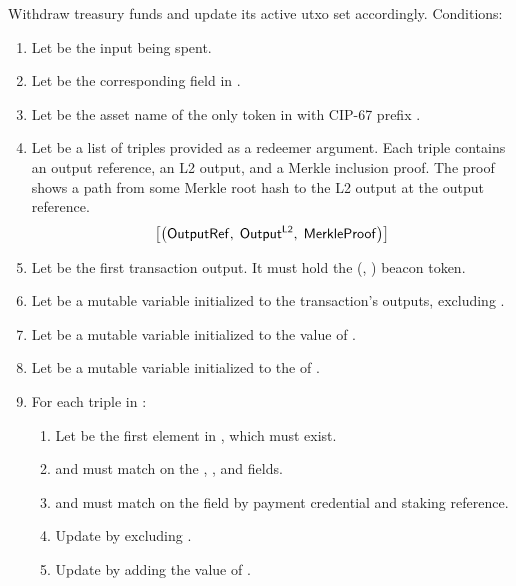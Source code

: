 \documentclass[../hydrozoa.tex]{subfiles}
\begin{document}
Withdraw treasury funds and update its active utxo set accordingly.
Conditions:
\begin{enumerate}
  \item Let  be the input being spent.
  \item Let  be the corresponding field in .
  \item Let  be the asset name of the only  token in  with CIP-67 prefix \headBeaconToken{}.
  \item Let  be a list of triples provided as a redeemer argument.
      Each triple contains an output reference, an L2 output, and a Merkle inclusion proof.
      The proof shows a path from some Merkle root hash to the L2 output at the output reference.
      \begin{equation*}
        \left[\left(
          \mathsf{OutputRef},\;
          \mathsf{Output^{L2}},\;
          \mathsf{MerkleProof}
        \right)\right]
      \end{equation*}
  \item Let  be the first transaction output. It must hold the (, ) beacon token.
  \item Let  be a mutable variable initialized to the transaction's outputs, excluding .
  \item Let  be a mutable variable initialized to the value of .
  \item Let  be a mutable variable initialized to the  of .
  \item For each triple  in :
    \begin{enumerate}
      \item Let  be the first element in , which must exist.
      \item {} and  must match on the , , and  fields.
      \item {} and  must match on the  field by payment credential and staking reference.
      \item Update  by excluding .
      \item Update  by adding the value of .

\end{enumerate}
\end{enumerate}
\end{document}
